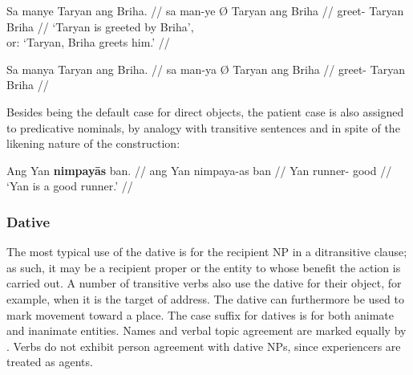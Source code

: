 \pex[aboveglftskip=2em]\label{ex:verbscram}
\a\label{ex:scramcorr}\begingl
	\gla Sa manye {} Taryan ang Briha. //
	\glb sa man-ye Ø Taryan ang Briha //
	\glc \PatT{} greet-\TsgF{} \Top{} Taryan 
		\Aarg{} Briha //
	\glft `Taryan is greeted by Briha',\\
		or: `Taryan, Briha greets him.' //
\endgl

\a\label{ex:scramfalse}\ljudge* \begingl
	\gla Sa manya {} Taryan ang Briha. //
	\glb sa man-ya Ø Taryan ang Briha //
	\glc \PatT{} greet-\TsgM{} \Top{} %
		Taryan \Aarg{} Briha //
\endgl\xe
{}

Besides being the default case for direct objects, the patient case is also 
assigned to predicative nominals, by analogy with transitive sentences and in 
spite of the likening nature of the construction:

\ex\begingl
	\gla Ang Yan \textbf{nimpayās} ban. //
	\glb ang Yan nimpaya-as ban //
	\glc \Aarg{} Yan runner-\Parg{} good //
	\glft `Yan is a good runner.' //
\endgl\xe


\subsubsection{Dative}
\label{subsubsec:dative}

The most typical use of the dative is for the recipient NP in a ditransitive
clause; as such, it may be a recipient proper or the entity to whose benefit
the action is carried out. A number of transitive verbs also use the dative for
their object, for example, when it is the target of address. The dative can
furthermore be used to mark movement toward a place. The case suffix for
datives is  for both animate and inanimate entities. Names
and verbal topic agreement are marked equally by . Verbs do not
exhibit person agreement with dative NPs, since experiencers are treated as
agents.

